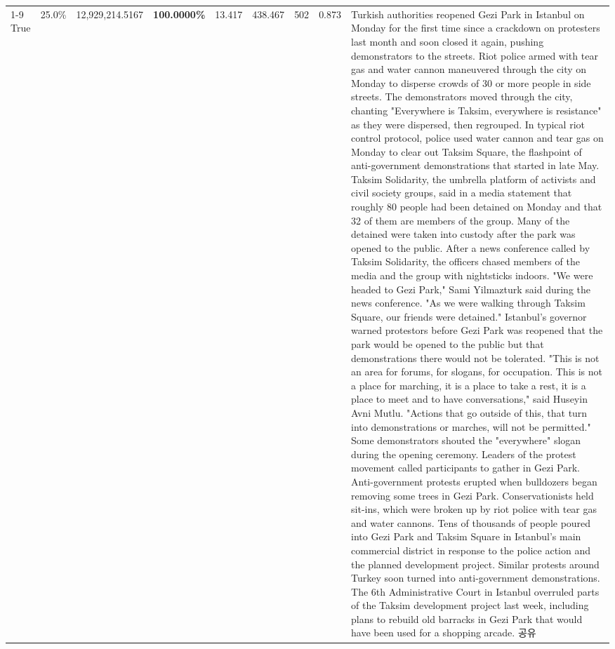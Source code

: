 \begin{table}[H]
\begin{tabular}{lllrlllll}
\cline{1-9}
True & 25.0\% & 12,929,214.5167 & \bfseries \color{red} 100.0000\% & 13.417 & 438.467 & 502 & 0.873 & Turkish authorities reopened Gezi Park in Istanbul on Monday for the first time since a crackdown on protesters last month and soon closed it again, pushing demonstrators to the streets. Riot police armed with tear gas and water cannon maneuvered through the city on Monday to disperse crowds of 30 or more people in side streets. The demonstrators moved through the city, chanting "Everywhere is Taksim, everywhere is resistance" as they were dispersed, then regrouped. In typical riot control protocol, police used water cannon and tear gas on Monday to clear out Taksim Square, the flashpoint of anti-government demonstrations that started in late May. Taksim Solidarity, the umbrella platform of activists and civil society groups, said in a media statement that roughly 80 people had been detained on Monday and that 32 of them are members of the group. Many of the detained were taken into custody after the park was opened to the public. After a news conference called by Taksim Solidarity, the officers chased members of the media and the group with nightsticks indoors. "We were headed to Gezi Park," Sami Yilmazturk said during the news conference. "As we were walking through Taksim Square, our friends were detained." Istanbul's governor warned protestors before Gezi Park was reopened that the park would be opened to the public but that demonstrations there would not be tolerated. "This is not an area for forums, for slogans, for occupation. This is not a place for marching, it is a place to take a rest, it is a place to meet and to have conversations," said Huseyin Avni Mutlu. "Actions that go outside of this, that turn into demonstrations or marches, will not be permitted." Some demonstrators shouted the "everywhere" slogan during the opening ceremony. Leaders of the protest movement called participants to gather in Gezi Park. Anti-government protests erupted when bulldozers began removing some trees in Gezi Park. Conservationists held sit-ins, which were broken up by riot police with tear gas and water cannons. Tens of thousands of people poured into Gezi Park and Taksim Square in Istanbul's main commercial district in response to the police action and the planned development project. Similar protests around Turkey soon turned into anti-government demonstrations. The 6th Administrative Court in Istanbul overruled parts of the Taksim development project last week, including plans to rebuild old barracks in Gezi Park that would have been used for a shopping arcade. 공유 \\

\end{tabular}
\end{table}
